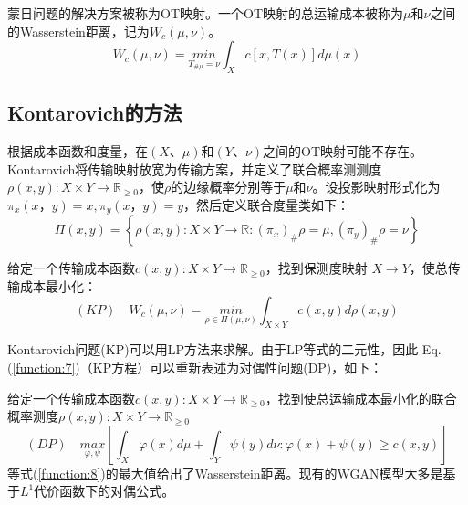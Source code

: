 \begin{definition}[OT映射]	\label{definition:3.2}
	蒙日问题的解决方案被称为OT映射。一个OT映射的总运输成本被称为$\mu$和$\nu$之间的Wasserstein距离，记为$W_c(\mu,\nu)$。
	\begin{equation}
		W_c(\mu,\nu)= \underset{T_{\# \mu}=\nu}{min} \int_X c[x,T(x)]d\mu(x)  
		\label{function:5}
	\end{equation}
\end{definition}

\subsection{Kontarovich的方法}

根据成本函数和度量，在$(X、\mu)$和$(Y、\nu)$之间的OT映射可能不存在。Kontarovich将传输映射放宽为传输方案，并定义了联合概率测测度$\rho(x,y): X \times Y \to \mathbb{R}_{\ge 0}$，使$\rho$的边缘概率分别等于$\mu$和$\nu$。设投影映射形式化为$\pi_x(x，y)=x, \pi_y(x，y)=y$，然后定义联合度量类如下：
\begin{equation}
	\Pi(x,y)= \left\{ \rho(x,y): X\times Y \to \mathbb{R} : (\pi_x)_{\#}\rho=\mu, (\pi_y)_{\#}\rho=\nu \right\} 
	\label{function:6}
\end{equation}

\begin{problem}[Kontarovich;KP]	\label{problem:3.2}
	给定一个传输成本函数$c(x,y): X \times Y\to\mathbb{R}_{\ge 0}$，找到保测度映射 $X \to Y$，使总传输成本最小化：
	\begin{equation}
		(KP) \quad W_c (\mu,\nu)= \underset{\rho \in \Pi(\mu,\nu)}{min} \int_{X \times Y} c(x,y)d\rho(x,y)  
		\label{function:7}
	\end{equation}
\end{problem}

Kontarovich问题(KP)可以用LP方法来求解。由于LP等式的二元性，因此 Eq.(\ref{function:7})（KP方程）可以重新表述为对偶性问题(DP)，如下：
\begin{problem}[对偶;DP]	\label{problem:3.3}
	给定一个传输成本函数$c(x,y):X\times Y \to \mathbb{R}_{\ge0}$，找到使总运输成本最小化的联合概率测度$\rho(x,y): X \times Y \to \mathbb{R}_{\ge0}$
	\begin{equation}
		(DP) \quad \underset{\varphi , \psi }{max}\left [ \int_X \varphi (x)d\mu + \int_Y \psi (y)d\nu : \varphi(x)+\psi(y) \ge c(x,y) \right ]   
		\label{function:8}
	\end{equation}
	等式(\ref{function:8})的最大值给出了Wasserstein距离。现有的WGAN模型大多是基于$L^1$代价函数下的对偶公式。
\end{problem}

